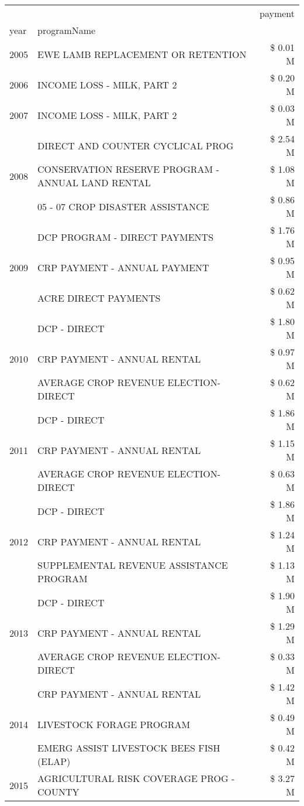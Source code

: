 \begin{tabular}{llr}
\toprule
 &  & payment \\
year & programName &  \\
\midrule
2005 & EWE LAMB REPLACEMENT OR RETENTION & \$ 0.01 M \\
\cline{1-3}
2006 & INCOME LOSS - MILK, PART 2 & \$ 0.20 M \\
\cline{1-3}
2007 & INCOME LOSS - MILK, PART 2 & \$ 0.03 M \\
\cline{1-3}
\multirow[t]{3}{*}{2008} & DIRECT AND COUNTER CYCLICAL PROG & \$ 2.54 M \\
 & CONSERVATION RESERVE PROGRAM - ANNUAL LAND RENTAL & \$ 1.08 M \\
 & 05 - 07 CROP DISASTER ASSISTANCE & \$ 0.86 M \\
\cline{1-3}
\multirow[t]{3}{*}{2009} & DCP PROGRAM - DIRECT PAYMENTS & \$ 1.76 M \\
 & CRP PAYMENT - ANNUAL PAYMENT & \$ 0.95 M \\
 & ACRE DIRECT PAYMENTS & \$ 0.62 M \\
\cline{1-3}
\multirow[t]{3}{*}{2010} & DCP - DIRECT & \$ 1.80 M \\
 & CRP PAYMENT - ANNUAL RENTAL & \$ 0.97 M \\
 & AVERAGE CROP REVENUE ELECTION-DIRECT & \$ 0.62 M \\
\cline{1-3}
\multirow[t]{3}{*}{2011} & DCP - DIRECT & \$ 1.86 M \\
 & CRP PAYMENT - ANNUAL RENTAL & \$ 1.15 M \\
 & AVERAGE CROP REVENUE ELECTION-DIRECT & \$ 0.63 M \\
\cline{1-3}
\multirow[t]{3}{*}{2012} & DCP - DIRECT & \$ 1.86 M \\
 & CRP PAYMENT - ANNUAL RENTAL & \$ 1.24 M \\
 & SUPPLEMENTAL REVENUE ASSISTANCE PROGRAM & \$ 1.13 M \\
\cline{1-3}
\multirow[t]{3}{*}{2013} & DCP - DIRECT & \$ 1.90 M \\
 & CRP PAYMENT - ANNUAL RENTAL & \$ 1.29 M \\
 & AVERAGE CROP REVENUE ELECTION-DIRECT & \$ 0.33 M \\
\cline{1-3}
\multirow[t]{3}{*}{2014} & CRP PAYMENT - ANNUAL RENTAL & \$ 1.42 M \\
 & LIVESTOCK FORAGE PROGRAM & \$ 0.49 M \\
 & EMERG ASSIST LIVESTOCK BEES FISH (ELAP) & \$ 0.42 M \\
\cline{1-3}
\multirow[t]{3}{*}{2015} & AGRICULTURAL RISK COVERAGE PROG - COUNTY & \$ 3.27 M \\

\end{tabular}
